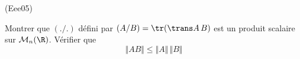 \begin{tiny}(Eee05)\end{tiny}
Montrer que $(./.)$ défini par $(A/ B) = \tr (\trans A\,B)$ est un produit scalaire sur $\mathcal{M}_n(\R)$. V{\'e}rifier que 
\[\Vert AB \Vert \leq \Vert A \Vert \,\Vert B \Vert\]
